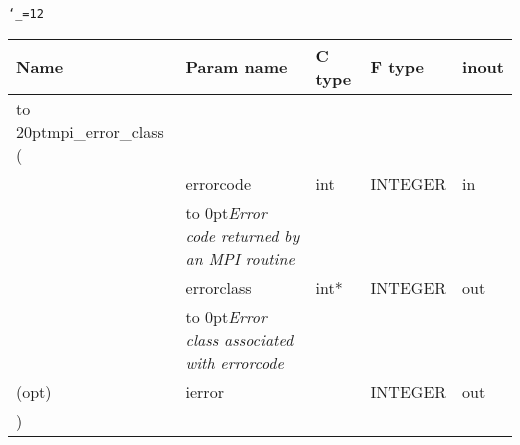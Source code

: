 \begingroup\tt\catcode`\_=12
\begin{tabular}{lllll}
\toprule
\textrm{Name}&\textrm{Param name}&\textrm{C type}&\textrm{F type}&\textrm{inout}\\
\midrule
\hbox to 20pt{mpi_error_class (\hss} \\
&errorcode&int&INTEGER&in\\ [-3pt]
&\hbox to 0pt{\footnotesize\sl Error code returned by an MPI routine\hss}\\
&errorclass&int*&INTEGER&out\\ [-3pt]
&\hbox to 0pt{\footnotesize\sl Error class associated with errorcode\hss}\\
(opt)&ierror&&INTEGER&out\\
)\\
\bottomrule
\end{tabular}
\endgroup

